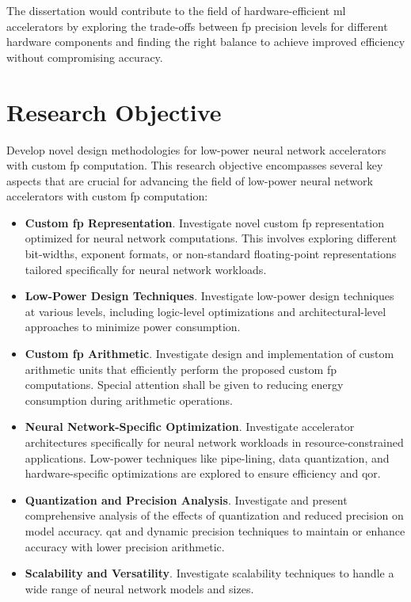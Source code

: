 The dissertation would contribute to the field of hardware-efficient \gls{ml} accelerators by exploring the trade-offs between \gls{fp} precision levels for different hardware components and finding the right balance to achieve improved efficiency without compromising accuracy.

\section{Research Objective}
Develop novel design methodologies for low-power neural network accelerators with custom \gls{fp} computation. This research objective encompasses several key aspects that are crucial for advancing the field of low-power neural network accelerators with custom \gls{fp} computation:

\begin{itemize}
	\item \textbf{Custom \gls{fp} Representation}. Investigate novel custom \gls{fp} representation optimized for neural network computations. This involves exploring different bit-widths, exponent formats, or non-standard floating-point representations tailored specifically for neural network workloads.
	\item \textbf{Low-Power Design Techniques}. Investigate low-power design techniques at various levels, including logic-level optimizations and architectural-level approaches to minimize power consumption.
	\item \textbf{Custom \gls{fp} Arithmetic}. Investigate design and implementation of custom arithmetic units that efficiently perform the proposed custom \gls{fp} computations. Special attention shall be given to reducing energy consumption during arithmetic operations.
	\item \textbf{Neural Network-Specific Optimization}. Investigate accelerator architectures specifically for neural network workloads in resource-constrained applications. Low-power techniques like pipe-lining, data quantization, and hardware-specific optimizations are explored to ensure efficiency and \gls{qor}.
	\item \textbf{Quantization and Precision Analysis}. Investigate and present comprehensive analysis of the effects of quantization and reduced precision on model accuracy. \gls{qat} and dynamic precision techniques to maintain or enhance accuracy with lower precision arithmetic.
	\item \textbf{Scalability and Versatility}. Investigate scalability techniques to handle a wide range of neural network models and sizes.

\end{itemize}
